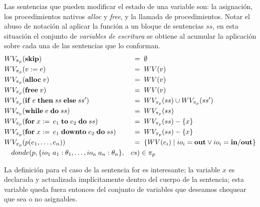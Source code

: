 Las sentencias que pueden modificar el estado de una variable son:
la asignación, los procedimientos nativos \textit{alloc} y \textit{free}, y la llamada de procedimientos.
Notar el abuso de notación al aplicar la función a un bloque de sentencias $ss$, en esta situación el conjunto de \textit{variables de escritura} se obtiene al acumular la aplicación sobre cada una de las sentencias que lo conforman.
\begin{alignat*}{2}
&\WVs{\T{skip}}
&&\;=\;
\emptyset
\\
&\WVs{v := e}
&&\;=\;
\WV{v}
\\
&\WVs{\T{alloc} \; v}
&&\;=\;
\WV{v}
\\
&\WVs{\T{free} \; v}
&&\;=\;
\WV{v}
\\
&\WVs{\T{if} \; e \; \T{then} \; ss \; \T{else} \; ss'}
&&\;=\;
\WVs{ss} \cup \WVs{ss'}
\\
&\WVs{\T{while} \; e \; \T{do} \; ss}
&&\;=\;
\WVs{ss}
\\
&\WVs{\T{for} \; x := \, e_1 \; \T{to} \; e_2 \; \T{do} \; ss}
&&\;=\;
\WVs{ss} - \{ x \}
\\
&\WVs{\T{for} \; x := \, e_1 \; \T{downto} \; e_2 \; \T{do} \; ss}
&&\;=\;
\WVs{ss} - \{ x \}
\\
&\WVs{p(e_1, \ldots, e_n)}
&&\;=\;
\{ \WV{e_i} \mid io_i = \T{out} \vee io_i = \T{in/out} \}\\
&\hspace{10px} donde (p, \{ io_1 \; a_1: \theta_1, \ldots, io_n \; a_n: \theta_n \}, && cs) \in \pi_{p} 
\end{alignat*}

La definición para el caso de la sentencia for es interesante; la variable $x$ es declarada y actualizada implícitamente dentro del cuerpo de la sentencia; esta variable queda fuera entonces del conjunto de variables que deseamos chequear que sea o no asignables.

